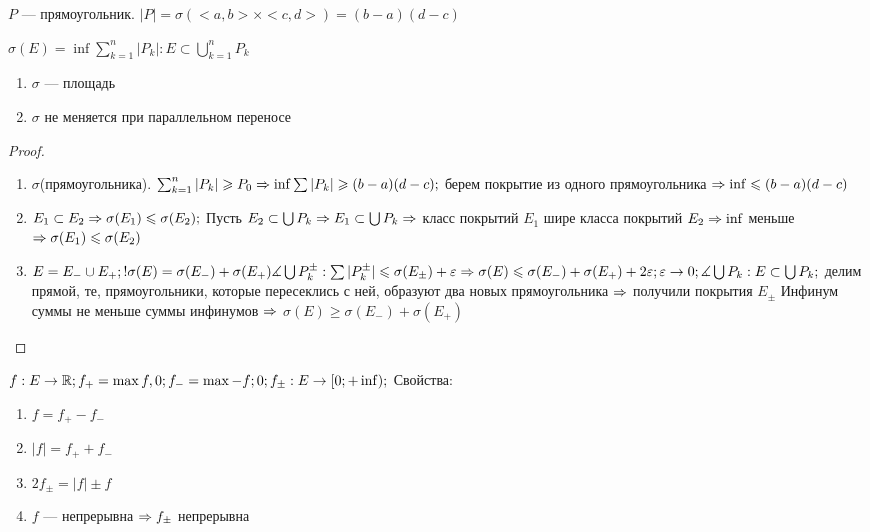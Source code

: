 \begin{Def}
$P$ --- прямоугольник. $|P| = \sigma(<a, b> \times <c, d>) = (b - a)(d - c)$
\end{Def}

\begin{Def}
$\sigma(E) = \inf{\sum_{k = 1}^n |P_k|: E \subset \bigcup_{k = 1}^n P_k}$
\end{Def}

\begin{theorem}{}
\begin{enumerate}
\item $\sigma$ --- площадь
\item $\sigma$ не меняется при параллельном переносе
\end{enumerate}
\end{theorem}
\begin{proof}
\begin{enumerate}
\item
	$\sigma$(прямоугольника).
	$\sum_{k = 1}^n |P_k| \geqslant P_0 \Rightarrow \inf{\sum|P_k|} \geqslant (b - a)(d - c); $
	берем покрытие из одного прямоугольника $\Rightarrow \inf \leqslant (b - a)(d - c)$
\item
	$E_1 \subset E_2 \Rightarrow \sigma(E_1) \leqslant \sigma(E_2); $
	Пусть $E_2 \subset \bigcup P_k \Rightarrow E_1 \subset \bigcup P_k \Rightarrow$ класс покрытий $E_1$ шире класса покрытий $E_2 \Rightarrow \inf $ меньше $\Rightarrow \sigma(E_1) \leqslant \sigma(E_2)$
\item
	$E = E_{-} \cup E_{+}; ! \sigma(E) = \sigma(E_{-}) + \sigma(E_{+}) \measuredangle \bigcup P_k^{\pm}:
	\sum|P_k^{\pm}| \leqslant \sigma(E_{\pm}) + \varepsilon \Rightarrow \sigma(E) \leqslant \sigma(E_{-}) + \sigma(E_{+}) + 2\varepsilon;
	\varepsilon \rightarrow 0; \measuredangle \bigcup P_k: E \subset \bigcup P_k; $
	делим прямой, те, прямоугольники, которые пересеклись с ней, образуют два новых прямоугольника $\Rightarrow$ получили покрытия $E_{\pm}$
	Инфинум суммы не меньше суммы инфинумов $\Rightarrow$ $\sigma(E) \geqslant \sigma(E_{-}) + \sigma(E_{+})$
\end{enumerate}
\end{proof}

\begin{Def}
$f: E \rightarrow \mathbb{R} ; f_+ = \max {f, 0}; f_- = \max {-f; 0}; f_\pm : E \rightarrow [0; +\inf); $  Свойства:
\begin{enumerate}
\item $f = f_+ - f_- $
\item $|f| = f_+ + f_- $
\item $2f_\pm = |f| \pm f$
\item $f$ --- непрерывна $ \Rightarrow f_\pm $ непрерывна
\end{enumerate}
\end{Def}

